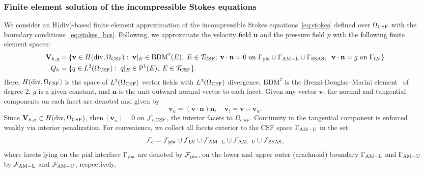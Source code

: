 \documentclass[fleqn,10pt]{wlscirep}
\begin{document}
\subsubsection{Finite element solution of the incompressible Stokes equations}
We consider an H(div)-based finite element approximation of the incompressible Stokes equations~\eqref{eq:stokes} defined over $\Omega_{\rm CSF}$ with the boundary conditions~\eqref{eq:stokes_bcs}. Following\cite{hong2016robust}, we approximate the velocity field $\mathbf{u}$ and the pressure field $p$ with the following finite element spaces:
\begin{align*}
  \mathbf{V}_{h,g} &= \{ \mathbf{v}  \in H(\mathrm{div}, \Omega_{\mathrm{CSF}}): \;
  \mathbf{v} \vert_{E} \in \mathrm{BDM}^2(E), \; E \in \mathcal{T}_{\rm CSF}; \;
  \mathbf{v} \cdot \mathbf{n} = 0
  \text{ on } \Gamma_{\rm{pia}} \cup \Gamma_{\rm AM-L} \cup \Gamma_{\rm{SSAS}}, \;\; \mathbf{v} \cdot \mathbf{n} =  g %
  \text{ on } \Gamma_{\mathrm{LV}} \}  \\ 
  Q_h  &= \{q \in L^2(\Omega_{\rm CSF}): \; q \vert_E \in \mathrm{P}^1(E),
  \; E \in \mathcal{T}_{\rm CSF} \}. 
\end{align*}
Here, $H(\mathrm{div}, \Omega_{\rm{CSF}})$ is the space of $L^2(\Omega_{\rm{CSF}})$ vector fields with $L^2(\Omega_{\rm{CSF}})$ divergence, $\mathrm{BDM}^2$ is the Brezzi-Douglas--Marini element~\cite{brezzi1987mixed} of degree 2, $g$ is a given constant, and $\mathbf{n}$ is the unit outward normal vector to each facet. Given any vector $\mathbf{v}$, the normal and tangential components on each facet are denoted and given by 
$$ \mathbf{v}_n = (\mathbf{v} \cdot \mathbf{n}) \mathbf{n}, \quad \mathbf{v}_t = \mathbf{v} - \mathbf{v}_n. 
$$ 
Since $\mathbf{V}_{h,g} \subset H(\mathrm{div}, \Omega_{\rm CSF})$, then $[\mathbf{v}_n] = 0 $ on $\mathcal{F}_{i, \rm CSF}$, the interior facets to $\Omega_{\mathrm{CSF}}$. Continuity in the
tangential component is enforced weakly via interior penalization. For
convenience, we collect all facets exterior to the CSF space  $\Gamma_{\rm AM-U}$ in the set
$$\mathcal{F}_{e} = \mathcal{F}_{\rm pia} \cup \mathcal{F}_{\rm LV}
\cup \mathcal{F}_{\rm AM-L}\cup \mathcal{F}_{\rm AM-U}  \cup \mathcal{F}_{\rm SSAS}, $$ 
where facets
lying on the pial interface $\Gamma_{\rm pia}$ are denoted by
$\mathcal{F}_{\rm pia}$, on the lower and upper outer (arachnoid) boundary
$\Gamma_{\rm AM-L}$ and $\Gamma_{\rm AM-U}$ by $\mathcal{F}_{\rm AM-L}$ and $\mathcal{F}_{\rm AM-U}$, respectively, 
\end{document}
